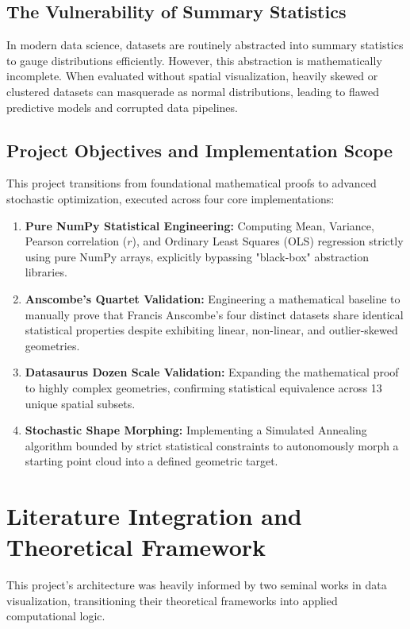 \documentclass[12pt, a4paper]{article}
\begin{document}
\subsection{The Vulnerability of Summary Statistics}
In modern data science, datasets are routinely abstracted into summary statistics to gauge distributions efficiently. However, this abstraction is mathematically incomplete. When evaluated without spatial visualization, heavily skewed or clustered datasets can masquerade as normal distributions, leading to flawed predictive models and corrupted data pipelines.

\subsection{Project Objectives and Implementation Scope}
This project transitions from foundational mathematical proofs to advanced stochastic optimization, executed across four core implementations:
\begin{enumerate}
    \item \textbf{Pure NumPy Statistical Engineering:} Computing Mean, Variance, Pearson correlation ($r$), and Ordinary Least Squares (OLS) regression strictly using pure NumPy arrays, explicitly bypassing "black-box" abstraction libraries.
    \item \textbf{Anscombe's Quartet Validation:} Engineering a mathematical baseline to manually prove that Francis Anscombe's four distinct datasets share identical statistical properties despite exhibiting linear, non-linear, and outlier-skewed geometries.
    \item \textbf{Datasaurus Dozen Scale Validation:} Expanding the mathematical proof to highly complex geometries, confirming statistical equivalence across 13 unique spatial subsets.
    \item \textbf{Stochastic Shape Morphing:} Implementing a Simulated Annealing algorithm bounded by strict statistical constraints to autonomously morph a starting point cloud into a defined geometric target.
\end{enumerate}

\section{Literature Integration and Theoretical Framework}
This project's architecture was heavily informed by two seminal works in data visualization, transitioning their theoretical frameworks into applied computational logic.
\end{document}
